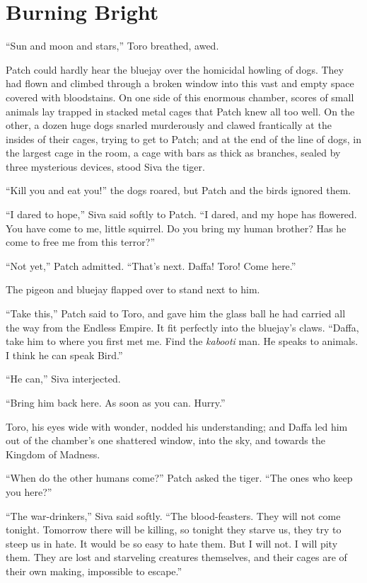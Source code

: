\documentclass[ebook,oneside,openany,17pt]{memoir}
\newenvironment{tolerant}[1]{%
  \par\tolerance=#1\relax
}{%
  \par
}
\renewcommand{\thechapter}{\Roman{chapter}}
\newcounter{sections}
\newcommand{\sections}[1]{%
  \section*{#1}
  \addtocounter{sections}{1}%
  \pdfbookmark[1]{#1}{section.\thechapter.\thesections}}
\begin{document}

\sections{Burning Bright}

“Sun and moon and stars,” Toro breathed, awed.

\begin{tolerant}{500}
Patch could hardly hear the bluejay over the homicidal howling of
dogs. They had flown and climbed through a broken window into this
vast and empty space covered with bloodstains. On one side of this
enormous chamber, scores of small animals lay trap\-ped in stacked metal
cages that Patch knew all too well. On the other, a dozen huge dogs
snarled murderously and clawed frantically at the insides of their
cages, trying to get to Patch; and at the end of the line of dogs, in
the largest cage in the room, a cage with bars as thick as branches,
sealed by three mysterious devices, stood Siva the tiger.
\end{tolerant}

“Kill you and eat you!” the dogs roared, but Patch and the birds
ignored them.

“I dared to hope,” Siva said softly to Patch. “I dared, and my hope
has flowered. You have come to me, little squirrel. Do you bring my
human brother? Has he come to free me from this terror?”

“Not yet,” Patch admitted. “That’s next. Daffa! Toro! Come here.”

The pigeon and bluejay flapped over to stand next to him.

“Take this,” Patch said to Toro, and gave him the glass ball he had
carried all the way from the Endless Empire. It fit perfectly into the
bluejay’s claws. “Daffa, take him to where you first met me. Find the
\emph{kabooti} man. He speaks to animals. I think he can speak
Bird.”

“He can,” Siva interjected.

“Bring him back here. As soon as you can. Hurry.”

Toro, his eyes wide with wonder, nodded his understanding; and Daffa
led him out of the chamber’s one shattered window, into the sky, and
towards the Kingdom of Madness.

“When do the other humans come?” Patch asked the tiger. “The ones who
keep you here?”

\begin{tolerant}{2000}
“The war-drinkers,” Siva said softly. “The blood-feasters. They will
not come tonight. Tomorrow there will be killing, so tonight they
starve us, they try to steep us in hate. It would be so easy to hate
them. But I will not. I will pity them. They are lost and starveling
creatures themselves, and their cages are of their own making,
impossible to escape.”
\end{tolerant}
\end{document}

